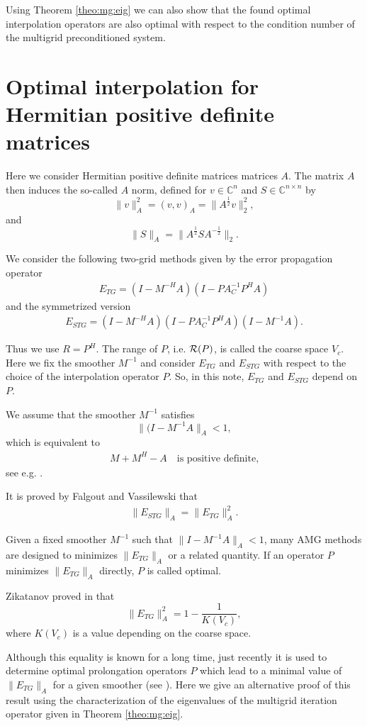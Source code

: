 \documentclass[final]{amsart}
\newcommand{\uha}{^{\frac{1}{2}}}
\newcommand{\umha}{^{-\frac{1}{2}}}
\newcommand{\beq}{\begin{eqnarray}}
\newcommand{\eeq}{\end{eqnarray}}
\numberwithin{equation}{section}
\newcommand{\ran} {{\cal R}}
\newcommand{\bCn}{\mathbb{C}^n}
\newcommand{\Cnn}{\mathbb{C}^{n \times n}}
\begin{document}
Using Theorem \ref{theo:mg:eig} we can also show that the found   optimal
interpolation operators are also optimal  with
respect to the condition number  of the multigrid preconditioned system.

 

\section{Optimal interpolation  for Hermitian positive definite matrices}

Here   we  consider Hermitian  positive definite matrices matrices $A$. The
matrix $A$ then induces the so-called $A$ norm, defined for $v \in \bCn$ and $S
\in \Cnn$ by
\[
\| v \|_A^2 = (v,v)_A = \|A\uha v\|_2^2,
\]
and 
\[
\| S \|_A = \|A\uha S A\umha\|_2.
\]

We consider  the  following two-grid  methods given by the error propagation
operator
\beq \label{mge}
E_{TG} = (I-M^{-H}A)(I -  PA_C^{-1}P^HA)
\eeq
and the  symmetrized version 
\beq \label{smge}
E_{STG} = (I-M^{-H}A)(I -  PA_C^{-1}P^HA)(I-M^{-1}A).
\eeq

Thus  we use $R = P^H$. The range of $P$, i.e. $\ran (P)$, is called  the
coarse space $V_c$.
Here   we fix  the smoother $M^{-1}$ and consider $E_{TG}$ and $E_{STG}$ with
respect  to the choice of the interpolation operator $P$. So, in this note,
$E_{TG}$ and $E_{STG}$ depend on $P$.


We assume that the smoother $M^{-1}$ satisfies 
\[
 \|(I-M^{-1}A \|_A < 1,
\]
which is equivalent to 
\beq \label{eq:pos}
M +  M^{H} - A  \quad \mbox{is  positive definite,} 
\eeq
see e.g. \cite{Vas08}. 

It is proved by  Falgout and Vassilewski \cite{FalV04} that
\beq \label{normeq}
\|E_{STG}\|_A = \|E_{TG}\|_A^2.
\eeq

Given a fixed  smoother $M^{-1}$ such that $\| I-M^{-1}A\|_A < 1$, many AMG
methods are designed to minimizes $ \|E_{TG}\|_A$ or a related quantity. If an
operator  $P$ minimizes    $ \|E_{TG}\|_A$  directly, $P$ is called optimal.

Zikatanov proved in \cite{Zik08} that
\[
 \|E_{TG}\|_A^2 = 1 - \frac{1}{K(V_c)},
\]
where  $ K(V_c)$ is  a  value  depending  on the  coarse  space.

Although  this 
equality is known for a long time, just  recently it is used to determine
optimal prolongation operators $P$  which lead   to a minimal  value of
$\|E_{TG}\|_A$ for a given smoother (see \cite{XuZ17, Bra18}).  Here  we give
an  alternative proof of this result using the characterization of the
eigenvalues of the multigrid iteration operator  given in Theorem
\ref{theo:mg:eig}.
\end{document}
